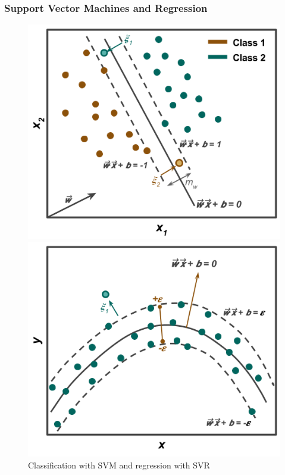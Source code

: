 \begin{frame}
  \frametitle{Support Vector Machines and Regression}
  \begin{figure}
    \centering
    \begin{minipage}{0.5\textwidth}
      \centering
      \includegraphics[width=\linewidth]{./figures/svm.png}
    \end{minipage}%
    \begin{minipage}{0.5\textwidth}
      \centering
      \includegraphics[width=\linewidth]{./figures/svr-a.png}
    \end{minipage}
    \caption{Classification with SVM and regression with SVR}
  \end{figure}
\end{frame}


